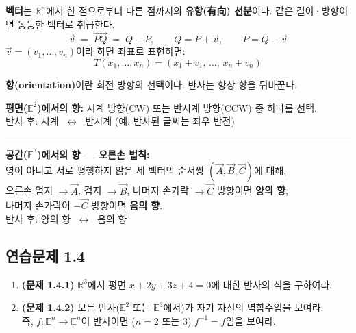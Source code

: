 \documentclass{article}
\begin{document}
\begin{tcolorbox}[
  colback=teal!4, colframe=teal!65!black,
  title=벡터 (보조 개념),
  fonttitle=\bfseries, boxrule=0.5mm, arc=3mm]

\textbf{벡터}는 $\mathbb{R}^n$에서 한 점으로부터 다른 점까지의 \textbf{유향(有向) 선분}이다.
같은 길이·방향이면 동등한 벡터로 취급한다.
\[
  \vec{v} \;=\; \overrightarrow{PQ} \;=\; Q - P, \qquad Q = P + \vec{v}, \qquad P = Q - \vec{v}
\]
$\vec{v} = (v_1, \ldots, v_n)$이라 하면 좌표로 표현하면:
\[
  T(x_1,\ldots,x_n) = (x_1+v_1,\,\ldots,\,x_n+v_n)
\]

\end{tcolorbox}

\begin{tcolorbox}[
  colback=red!4, colframe=red!60!black,
  title=정리: 반사와 향(Orientation),
  fonttitle=\bfseries, boxrule=0.5mm, arc=3mm]

\textbf{향(orientation)}이란 회전 방향의 선택이다. 반사는 항상 향을 뒤바꾼다.

\medskip
\noindent\textbf{평면($\mathbb{E}^2$)에서의 향:}
시계 방향(CW) 또는 반시계 방향(CCW) 중 하나를 선택.\\
반사 후: 시계 $\;\longleftrightarrow\;$ 반시계 (예: 반사된 글씨는 좌우 반전)

\noindent\textcolor{red!40!black}{\rule{\linewidth}{0.4pt}}

\noindent\textbf{공간($\mathbb{E}^3$)에서의 향 --- 오른손 법칙:}\\
영이 아니고 서로 평행하지 않은 세 벡터의 순서쌍 $(\vec{A},\vec{B},\vec{C})$에 대해,\\[3pt]
\hspace{1em}오른손 엄지 $\to \vec{A}$, 검지 $\to \vec{B}$, 나머지 손가락 $\to \vec{C}$ 방향이면 \textbf{양의 향},\\
\hspace{1em}나머지 손가락이 $-\vec{C}$ 방향이면 \textbf{음의 향}.\\[4pt]
반사 후: 양의 향 $\;\longleftrightarrow\;$ 음의 향

\end{tcolorbox}

\subsection*{연습문제 1.4}

\begin{enumerate}
  \item \textbf{(문제 1.4.1)}\quad
    $\mathbb{R}^3$에서 평면 $x + 2y + 3z + 4 = 0$에 대한 반사의 식을 구하여라.

  \item \textbf{(문제 1.4.2)}\quad
    모든 반사($\mathbb{E}^2$ 또는 $\mathbb{E}^3$에서)가 자기 자신의 역함수임을 보여라.\\
    즉, $f:\mathbb{E}^n \to \mathbb{E}^n$이 반사이면 ($n=2$ 또는 $3$) $f^{-1} = f$임을 보여라.
\end{enumerate}
\end{document}
